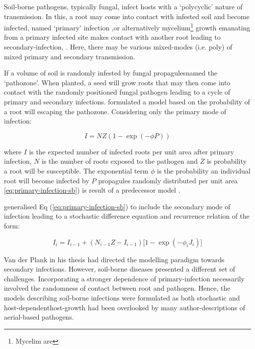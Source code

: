     
    Soil-borne pathogens, typically fungal, infect hosts with a `polycyclic' nature of transmission. In this, a root may come into contact with infested soil and become infected, named `primary' infection ,or alternatively mycelium\footnote{Mycelim are} growth emanating from a primary infected site makes contact with another root leading to secondary-infection, \cite{crowe1980vertical}. Here, there may be various mixed-modes (i.e. poly) of mixed primary and secondary transmission. 
    
    If a volume of soil is randomly infested by fungal propagules\textemdash named the `pathozone'. When planted, a seed will grow roots that may then come into contact with the randomly positioned fungal pathogen leading to a cycle of primary and secondary infections. \cite{pub.1034311339} formulated a model based on the probability of a root will escaping the pathozone. Considering only the primary mode of infection: 
    
    \begin{equation}
        \label{eq:primary-infection-sb}
        I=NZ(1-\exp(-\phi P))
    \end{equation}
    
    where $I$ is the expected number of infected roots per unit area after primary infection, $N$ is the number of roots exposed to the pathogen and $Z$ is probability a root will be susceptible. The exponential term $\phi$ is the probability an individual root will become infected by $P$ propagules randomly distributed per unit area \ref{eq:primary-infection-sb}) is result of a predecessor model \cite{gilligan1985probability}. 
    
    \cite{pub.1034311339} generalised Eq (\ref{eq:primary-infection-sb}) to include the secondary mode of infection leading to a stochastic difference equation and recurrence relation of the form:
    
    \begin{equation}
        \label{eq:primary_and_secondary}
        I_{i}= I_{i-1} + (N_{i-1}Z - I_{i-1})\big[1 - \exp(-\phi_i J_i)\big]
    \end{equation}
    
    Van der Plank in his thesis had directed the modelling paradigm towards secondary infections. However, soil-borne diseases presented a different set of challenges. Incorporating a stronger dependence of primary-infection necessarily involved the randomness of contact between root and pathogen. Hence, the models describing soil-borne infections were formulated as both stochastic and host-dependent\textemdash host-growth had been overlooked by many author-descriptions of aerial-based pathogens.
    
